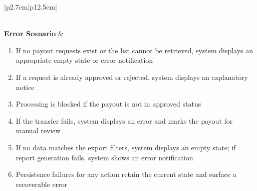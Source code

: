 \begin{table}[H]
\begin{tabular}{|p{2.7cm}|p{12.5cm}|}
\begin{minipage}[t]{\linewidth}
\begin{enumerate}[topsep=0pt,itemsep=1pt,parsep=0pt,partopsep=0pt]
            \end{enumerate}
        \end{minipage} \\
        \hline
        \textbf{Error Scenario} & \begin{minipage}[t]{\linewidth}
            \begin{enumerate}[topsep=0pt,itemsep=1pt,parsep=0pt,partopsep=0pt]
                \item If no payout requests exist or the list cannot be retrieved, system displays an appropriate empty state or error notification
                \item If a request is already approved or rejected, system displays an explanatory notice
                \item Processing is blocked if the payout is not in approved status
                \item If the transfer fails, system displays an error and marks the payout for manual review
                \item If no data matches the export filters, system displays an empty state; if report generation fails, system shows an error notification
                \item Persistence failures for any action retain the current state and surface a recoverable error
            \end{enumerate}
        \end{minipage} \\
        \hline
    \end{tabular}
    \label{tab:admin-payout-requests}
\end{table}
